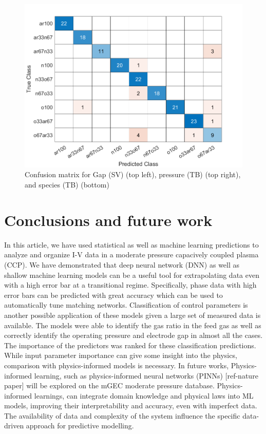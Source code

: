 \documentclass[12pt]{iopart}
\begin{document}
\begin{figure}[ht!]
\begin{center}
 \begin{minipage}{0.495\textwidth}
    \includegraphics[width=1\textwidth]{ConfusionMatrixTB2.png}
\end{minipage}
\caption{Confusion matrix for Gap (SV) (top left), pressure (TB) (top right), and species (TB) (bottom) } 

\label{Fig:gap_SV,pressure_TB,species_TB}
\end{center}
\end{figure}


\section{Conclusions and future work}\label{Sect:Conclusions}

In this article, we have used statistical as well as machine learning predictions to analyze and organize I-V data in a moderate pressure capacively coupled plasma (CCP). We have demonstrated that deep neural network (DNN) as well as shallow machine learning models can be a useful tool for extrapolating data even with a high error bar at a transitional regime. Specifically, phase data with high error bars can be predicted with great accuracy which can be used to automatically tune matching networks. Classification of control parameters is another possible application of these models given a large set of measured data is available. The models were able to identify the gas ratio in the feed gas as well as correctly identify the operating pressure and electrode gap in almost all the cases. The importance of the predictors was ranked for these classification predictions. While input parameter importance can give some insight into the physics, comparison with physics-informed models is necessary. In future works, Physics-informed learning, such as physics-informed neural networks (PINNs) [ref-nature paper] will be explored on the mGEC moderate pressure database. Physics-informed learnings, can integrate domain knowledge and physical laws into ML models, improving their interpretability and accuracy, even with imperfect data. The availability of data and complexity of the system influence the specific data-driven approach for predictive modelling.
\end{document}
